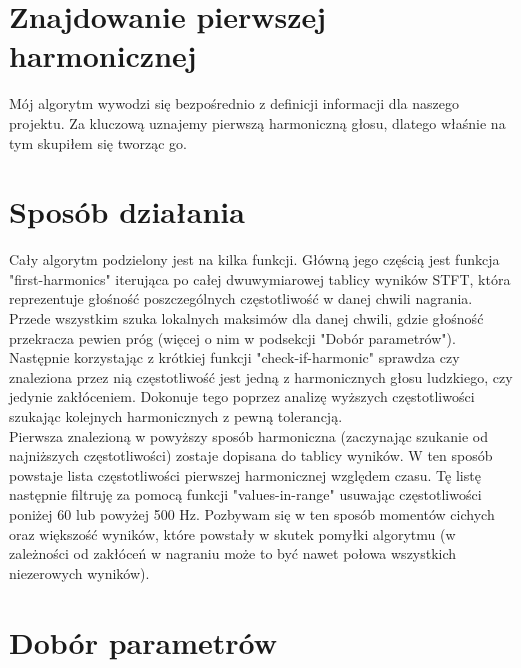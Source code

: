 \documentclass[a4paper,12pt]{extarticle}
\begin{document}
\clearpage

\section{Znajdowanie pierwszej harmonicznej}
\label{sec:harmonic}

Mój algorytm wywodzi się bezpośrednio z definicji informacji dla naszego projektu. Za kluczową uznajemy pierwszą harmoniczną głosu, dlatego właśnie na tym skupiłem się tworząc go.
       
\section*{Sposób działania}

\noindent Cały algorytm podzielony jest na kilka funkcji. Główną jego częścią jest funkcja "first-harmonics" iterująca po całej dwuwymiarowej tablicy wyników STFT, która reprezentuje głośność poszczególnych częstotliwość w danej chwili nagrania. Przede wszystkim szuka lokalnych maksimów dla danej chwili, gdzie głośność przekracza pewien próg (więcej o nim w podsekcji "Dobór parametrów").\\

\noindent Następnie korzystając z krótkiej funkcji "check-if-harmonic" sprawdza czy znaleziona przez nią częstotliwość jest jedną z harmonicznych głosu ludzkiego, czy jedynie zakłóceniem. Dokonuje tego poprzez analizę wyższych częstotliwości szukając kolejnych harmonicznych z pewną tolerancją.\\

\noindent Pierwsza znalezioną w powyższy sposób harmoniczna (zaczynając szukanie od najniższych częstotliwości) zostaje dopisana do tablicy wyników. W ten sposób powstaje lista częstotliwości pierwszej harmonicznej względem czasu. Tę listę następnie filtruję za pomocą funkcji "values-in-range" usuwając częstotliwości poniżej 60 lub powyżej 500 Hz. Pozbywam się w ten sposób momentów cichych oraz większość wyników, które powstały w skutek pomyłki algorytmu (w zależności od zakłóceń w nagraniu może to być nawet połowa wszystkich niezerowych wyników).

\newpage
       
\section*{Dobór parametrów}
\end{document}
